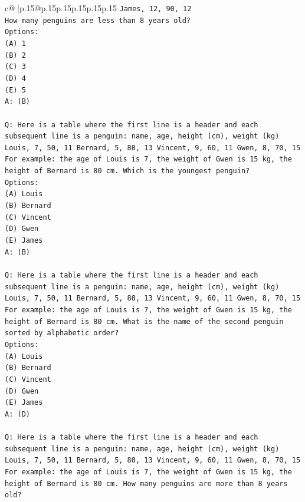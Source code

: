 \documentclass{article}
\begin{document}
{\begin{supertabular}{c@{$\;$}|p{.15\linewidth}@{}p{.15\linewidth}p{.15\linewidth}p{.15\linewidth}p{.15\linewidth}p{.15\linewidth}}
{{{\texttt{James, 12, 90, 12} \\
\texttt{How many penguins are less than 8 years old?} \\
\texttt{Options:} \\
\texttt{(A) 1} \\
\texttt{(B) 2} \\
\texttt{(C) 3} \\
\texttt{(D) 4} \\
\texttt{(E) 5} \\
\texttt{A: (B)} \\
\\ 
\texttt{Q: Here is a table where the first line is a header and each subsequent line is a penguin:  name, age, height (cm), weight (kg) Louis, 7, 50, 11 Bernard, 5, 80, 13 Vincent, 9, 60, 11 Gwen, 8, 70, 15  For example: the age of Louis is 7, the weight of Gwen is 15 kg, the height of Bernard is 80 cm.  Which is the youngest penguin?} \\
\texttt{Options:} \\
\texttt{(A) Louis} \\
\texttt{(B) Bernard} \\
\texttt{(C) Vincent} \\
\texttt{(D) Gwen} \\
\texttt{(E) James} \\
\texttt{A: (B)} \\
\\ 
\texttt{Q: Here is a table where the first line is a header and each subsequent line is a penguin:  name, age, height (cm), weight (kg) Louis, 7, 50, 11 Bernard, 5, 80, 13 Vincent, 9, 60, 11 Gwen, 8, 70, 15  For example: the age of Louis is 7, the weight of Gwen is 15 kg, the height of Bernard is 80 cm.  What is the name of the second penguin sorted by alphabetic order?} \\
\texttt{Options:} \\
\texttt{(A) Louis} \\
\texttt{(B) Bernard} \\
\texttt{(C) Vincent} \\
\texttt{(D) Gwen} \\
\texttt{(E) James} \\
\texttt{A: (D)} \\
\\ 
\texttt{Q: Here is a table where the first line is a header and each subsequent line is a penguin:  name, age, height (cm), weight (kg) Louis, 7, 50, 11 Bernard, 5, 80, 13 Vincent, 9, 60, 11 Gwen, 8, 70, 15  For example: the age of Louis is 7, the weight of Gwen is 15 kg, the height of Bernard is 80 cm.  How many penguins are more than 8 years old?} \\
}}}
\end{supertabular}}
\end{document}
